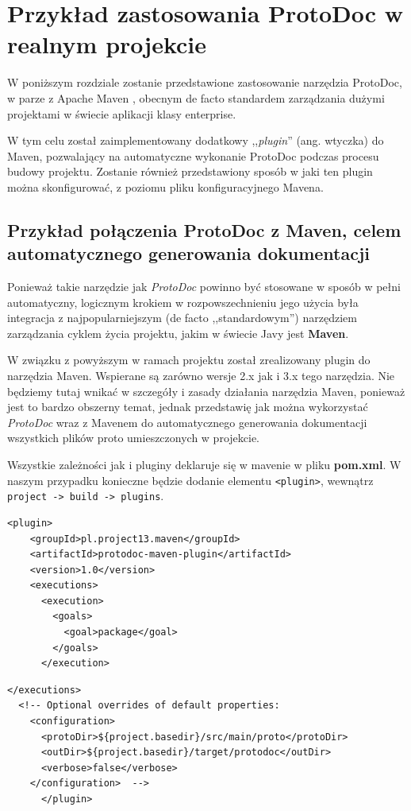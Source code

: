 \documentclass[pdflatex,11pt]{aghdpl}
\begin{document}
\chapter{Przykład zastosowania ProtoDoc w realnym projekcie}
\label{maven}

W poniższym rozdziale zostanie przedstawione zastosowanie narzędzia ProtoDoc, w parze z Apache Maven \cite{Maven}, obecnym
de facto standardem zarządzania dużymi projektami w świecie aplikacji klasy enterprise.

W tym celu został zaimplementowany dodatkowy ,,\textit{plugin}'' (ang. wtyczka) do Maven, pozwalający na automatyczne 
wykonanie ProtoDoc podczas procesu budowy projektu. Zostanie również przedstawiony sposób w jaki ten plugin można skonfigurować,
z poziomu pliku konfiguracyjnego Mavena.

\section{Przykład połączenia ProtoDoc z Maven, celem automatycznego generowania dokumentacji}
Ponieważ takie narzędzie jak \textit{ProtoDoc} powinno być stosowane w sposób w pełni automatyczny, logicznym krokiem w rozpowszechnieniu
jego użycia była integracja z najpopularniejszym (de facto ,,standardowym'') narzędziem zarządzania cyklem życia projektu, jakim w świecie Javy jest \textbf{Maven}.

W związku z powyższym w ramach projektu został zrealizowany plugin do narzędzia Maven. Wspierane są zarówno wersje 2.x jak i 3.x tego narzędzia. 
Nie będziemy tutaj wnikać w szczegóły i zasady działania narzędzia Maven, ponieważ jest to bardzo obszerny temat, jednak
przedstawię jak można wykorzystać \textit{ProtoDoc} wraz z Mavenem do automatycznego generowania dokumentacji wszystkich plików proto umieszczonych w projekcie.

Wszystkie zależności jak i pluginy deklaruje się w mavenie w pliku \textbf{pom.xml}. W naszym przypadku konieczne będzie dodanie elementu \verb|<plugin>|, wewnątrz
\verb|project -> build -> plugins|.

\begin{lstlisting}[caption={Deklaracja korzystania z pluginu ProtoDoc}, label={last:use_the_maven_plugin}]
      <plugin>
	<groupId>pl.project13.maven</groupId>
	<artifactId>protodoc-maven-plugin</artifactId>
	<version>1.0</version>
	<executions>
	  <execution>
	    <goals>
	      <goal>package</goal>
	    </goals>
	  </execution>
\end{lstlisting}
\begin{lstlisting}[caption={Kontunuacja listingu \ref{last:use_the_maven_plugin}}]
	</executions>
  <!-- Optional overrides of default properties:
	<configuration>
	  <protoDir>${project.basedir}/src/main/proto</protoDir>
	  <outDir>${project.basedir}/target/protodoc</outDir>
	  <verbose>false</verbose>
	</configuration>  -->
      </plugin>
\end{lstlisting}
\end{document}
